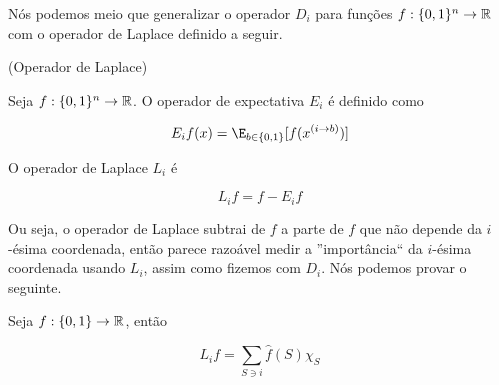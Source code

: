 Nós podemos meio que generalizar o operador $D_{i}$ para funções $f: \{0, 1\}^{n} \to \mathbb{R}$ com o operador de Laplace definido a seguir.

\begin{defi} (Operador de Laplace)

Seja $f: \{0, 1\}^{n} \to \mathbb{R}$. O operador de expectativa $E_{i}$ é definido como

\begin{equation*}
E_{i}f(x) = \E_{b \in \binalph}[f(x^{(i \rightarrow b)})]
\end{equation*}

O operador de Laplace $L_{i}$ é

\begin{equation*}
L_{i}f = f - E_{i}f
\end{equation*}

\end{defi}

Ou seja, o operador de Laplace subtrai de $f$ a parte de $f$ que não depende da $i$-ésima coordenada, então parece razoável medir a ''importância`` da $i$-ésima coordenada usando $L_{i}$, assim como fizemos com $D_{i}$. Nós podemos provar o seguinte.

\begin{prop}

Seja $f: \{0, 1\} \to \mathbb{R}$, então

\begin{equation*}
L_{i}f = \sum_{S \ni i} \widehat{f}(S)\chi_{S}
\end{equation*}

\end{prop}

